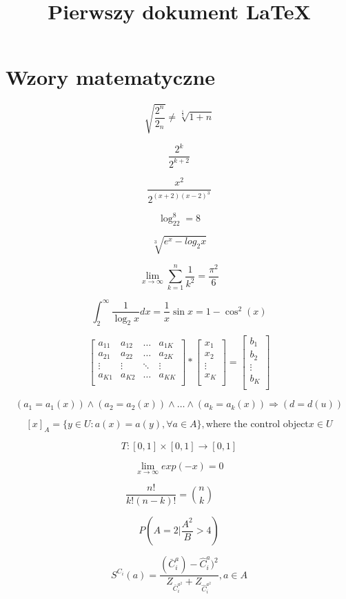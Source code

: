 \documentclass[20pt, letterpaper, titlepage]{article}
\title{Pierwszy dokument LaTeX}
\begin{document}
\section{Wzory matematyczne}
\begin{LARGE}
$$ \sqrt{ \frac{2^{n}}{2_n}} \neq \sqrt[\frac{1}{3}]{1+n} $$

$$ \frac{2^k}{2^{k+2}} $$


$$ \frac{x^2}{2^{(x+2)(x-2)^3}} $$

$$ \log_22^{8} = 8$$

$$ \sqrt[3]{e^x - log_2x} $$

$$\lim_{x \to \infty } \sum_{k=1}^{n} \frac{1}{k^2} = \frac{\pi^2}{6}$$ 

$$\int_{2}^{\infty} \frac{1}{\log_2x}dx = \frac{1}{x} \sin x = 1 - \cos^2(x)$$

$$ \left[ \begin{array}{cccc}
a_{11} & a_{12} & \ldots & a_{1K} \\
a_{21} & a_{22} & \ldots & a_{2K}\\
\vdots & \vdots & \ddots & \vdots \\
a_{K1} & a_{K2} & \ldots & a_{KK}\\
\end{array} \right]*
\left[ \begin{array}{c}
x_{1} \\
x_{2} \\
\vdots \\
x_{K} \\
\end{array} \right]=
\left[ \begin{array}{c}
b_{1} \\
b_{2} \\
\vdots \\
b_{K} \\
\end{array} \right]$$

$$
(a_1 = a_1(x)) \wedge (a_2 = a_2(x)) \wedge \ldots \wedge (a_k = a_k(x)) \Rightarrow (d = d(u))
$$

$$
[x]_A = \{y \in U : a(x) = a(y),\forall a \in A\}, \text{where the control object} x \in U
$$

$$
T : [0,1] \times [0,1] \longrightarrow [0,1]
$$

$$
\lim_{x \to \infty} exp(-x) = 0
$$

$$
\frac{n!}{k!(n - k)!} = {n \choose k}\qquad
$$

$$
P{\left( A = 2 \bigg| \frac{A^2}{B} > 4 \right)}
$$


$$ S^{C_i}(a) = \frac{(\bar{C}_i^a) - \hat{C}_i^a)^2}{Z_{\bar{C}_i^{a^2}} + Z_{\hat{C}^{a^2}_i }}, a \in A $$
\end{LARGE}
\end{document}
